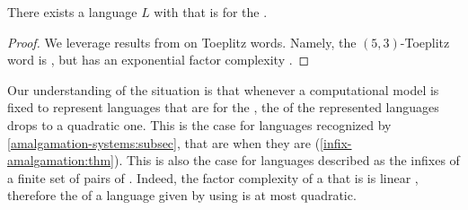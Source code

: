 \begin{lemma}
  \label{exponential-factor-complexity:lem}
  There exists a language $L$ with 
  that is  for the .
\end{lemma}
\begin{proof}
  We leverage results from \cite{CAKA97} on Toeplitz words.
  Namely, the 
  $(5, 3)$-Toeplitz word is  
  \cite[p. 499]{CAKA97},
  but has an exponential factor complexity 
  \cite[Theorem 5]{CAKA97}.
\end{proof}


Our understanding of the situation is that whenever a computational model is
fixed to represent languages that are  for the , the  of the represented languages drops to a
quadratic one. This is the case for languages recognized by  \cref{amalgamation-systems:subsec}, that are 
when they are  (\cref{infix-amalgamation:thm}). This is
also the case for languages described as the infixes of a finite set of pairs
of . Indeed, the factor complexity of a  that is  is linear \cite[Theorem 24]{NIPR09},
therefore the  of a language given by  using  is at most quadratic.


